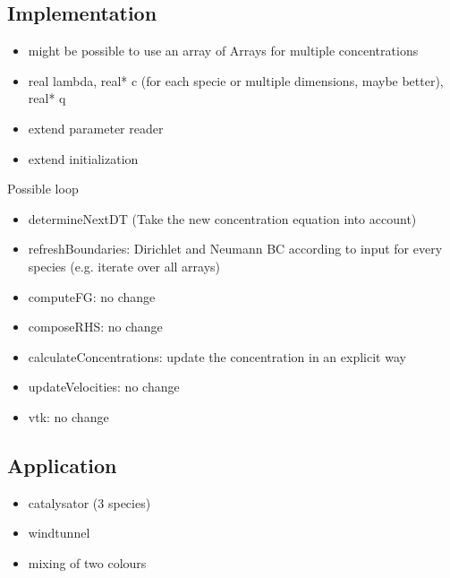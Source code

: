 \documentclass{article}
\begin{document}
\subsection{Implementation}
\begin{itemize}
	\item might be possible to use an array of Arrays for multiple
			concentrations
	\item real lambda, real* c (for each specie or multiple dimensions, maybe better), real* q 
	\item extend parameter reader
	\item extend initialization
\end{itemize}
Possible loop
\begin{itemize}
	\item determineNextDT (Take the new concentration equation into account)
    \item refreshBoundaries: Dirichlet and Neumann BC according to input for every species (e.g. iterate over all arrays)
    \item computeFG: no change
    \item composeRHS: no change
    \item calculateConcentrations: update the concentration in an explicit way
    \item updateVelocities: no change
    \item vtk: no change 
\end{itemize}

\subsection{Application}
\begin{itemize}
    \item catalysator (3 species)
	\item windtunnel
	\item mixing of two colours
\end{itemize}
\end{document}
